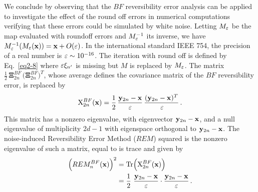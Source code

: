 
We conclude by observing that the $BF$ reversibility error analysis can be applied to investigate the effect of the round off errors in numerical computations~\cite{PANICHI201653} verifying that these errors could be simulated by white noise. Letting $M_\varepsilon$ be the map evaluated with roundoff errors and $M_\varepsilon^{-1}$ its inverse, we have $M^{-1}_\varepsilon(M_\varepsilon(\vb{x}))= \vb{x}+ O(\varepsilon)$. In the international standard IEEE 754, the precision of a real number is $\varepsilon\sim 10^{-16}$. The iteration with round off is defined by Eq.~\eqref{eq2-8} where $\varepsilon\xi_{n'}$ is missing but $M$ is replaced by $M_\varepsilon$. The matrix $\frac{1}{ 2}\, \boldsymbol{\Xi}_{2n}^{BF}\,\bigl(\boldsymbol{\Xi}_{2n}^{BF}\bigr)^T$, whose average defines the covariance matrix of the $BF$ reversibility error, is replaced by 
%
\begin{equation}
  \mathrm{X}_{2n}^{BF}(\vb{x})= \frac{1}{ 2}\,\frac{ \vb{y}_{2n}-\vb{x}}{ \varepsilon}\,\frac{(\vb{y}_{2n}-\vb{x})^T}{\,\varepsilon} \,.
\label{eq2_20}
\end{equation}  
%
This matrix has a nonzero eigenvalue, with eigenvector $\vb{y}_{2n}-\vb{x}$, and a null eigenvalue of multiplicity $2d-1$ with eigenspace orthogonal to $\vb{y}_{2n}-\vb{x}$. The noise-induced Reversibility Error Method ($REM$) squared is the nonzero eigenvalue of such a matrix, equal to is trace and given by  
%
\begin{equation}
    \begin{split}
    \Bigl(REM_n^{BF}(\vb{x})\Bigr)^2 &= \Tr\Bigl(   \mathrm{X}_{2n}^{BF}(\vb{x})\Bigr) \\
    &= \frac{1}{ 2} \,\, \frac{\vb{y}_{2n}-\vb{x}}{ \varepsilon} \cdot \frac{\vb{y}_{2n}-\vb{x}}{ \varepsilon} \,.
    \end{split}
\label{eq2_21}
\end{equation}
%

